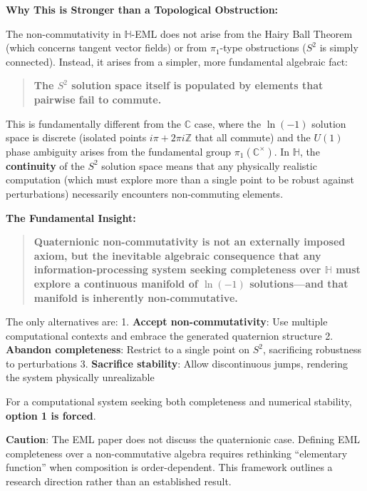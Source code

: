\documentclass[11pt]{article}
\begin{document}
\textbf{Why This is Stronger than a Topological Obstruction:}

The non-commutativity in \(\mathbb{H}\)-EML does not arise from the Hairy Ball Theorem (which concerns tangent vector fields) or from \(\pi_1\)-type obstructions (\(S^2\) is simply connected). Instead, it arises from a simpler, more fundamental algebraic fact:

\begin{quote}
\textbf{The \(S^2\) solution space itself is populated by elements that pairwise fail to commute.}
\end{quote}

This is fundamentally different from the \(\mathbb{C}\) case, where the \(\ln(-1)\) solution space is discrete (isolated points \(i\pi + 2\pi i\mathbb{Z}\) that all commute) and the \(U(1)\) phase ambiguity arises from the fundamental group \(\pi_1(\mathbb{C}^\times)\). In \(\mathbb{H}\), the \textbf{continuity} of the \(S^2\) solution space means that any physically realistic computation (which must explore more than a single point to be robust against perturbations) necessarily encounters non-commuting elements.

\textbf{The Fundamental Insight:}

\begin{quote}
\textbf{Quaternionic non-commutativity is not an externally imposed axiom, but the inevitable algebraic consequence that any information-processing system seeking completeness over \(\mathbb{H}\) must explore a continuous manifold of \(\ln(-1)\) solutions---and that manifold is inherently non-commutative.}
\end{quote}

The only alternatives are: 1. \textbf{Accept non-commutativity}: Use multiple computational contexts and embrace the generated quaternion structure 2. \textbf{Abandon completeness}: Restrict to a single point on \(S^2\), sacrificing robustness to perturbations 3. \textbf{Sacrifice stability}: Allow discontinuous jumps, rendering the system physically unrealizable

For a computational system seeking both completeness and numerical stability, \textbf{option 1 is forced}.

\textbf{Caution}: The EML paper does not discuss the quaternionic case. Defining EML completeness over a non-commutative algebra requires rethinking ``elementary function'' when composition is order-dependent. This framework outlines a research direction rather than an established result.
\end{document}
